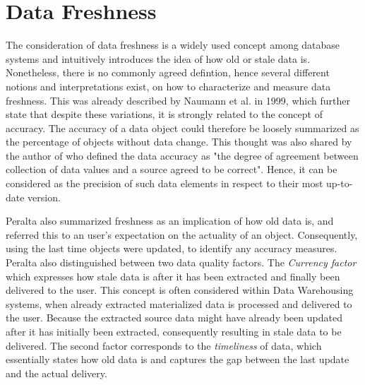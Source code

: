 
\section{Data Freshness}
\label{sec:definition}
The consideration of data freshness is a widely used concept among database systems and intuitively introduces the idea of how old or stale data is.
Nonetheless, there is no commonly agreed defintion, hence several different notions and interpretations exist, on how to characterize and measure data freshness.
This was already described by Naumann et al. \cite{naumann:1999} in 1999, which further state that despite these variations, it is strongly related to the concept of accuracy. 
The accuracy of a data object could therefore be loosely summarized as the percentage of objects without data change. 
This thought was also shared by the author of \cite{redman:1996} who defined the data accuracy as "the degree of agreement between 
collection of data values and a source agreed to be correct".
Hence, it can be considered as the precision of such data elements in respect to their most up-to-date version.



Peralta \cite{peralta:2006} also summarized freshness as an implication of how old data is, and referred this to an user's expectation on the actuality of an object. 
Consequently, using the last time objects were updated, to identify any accuracy measures. Peralta also distinguished between two data quality factors. 
The \emph{Currency factor} which expresses how stale data is after it has been extracted and finally been
delivered to the user. This concept is often considered within Data Warehousing systems, when already extracted materialized data is processed and delivered to the user.
Because the extracted source data might have already been updated after it has initially been extracted, consequently resulting in stale data to be delivered.
The second factor corresponds to the \emph{timeliness} of data, which essentially states how old data is and captures the gap between the last update and the actual delivery.



